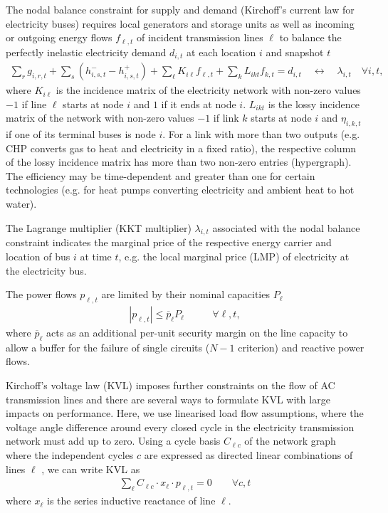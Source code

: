 The nodal balance constraint for supply and demand (Kirchoff's current law for electricity
buses) requires local generators and storage units as well as incoming or
outgoing energy flows $f_{\ell,t}$ of incident transmission lines $\ell$ to
balance the perfectly inelastic electricity demand $d_{i,t}$ at each location
$i$ and snapshot $t$
\begin{align}
    \sum_r g_{i,r,t} + \sum_s \left(h_{i,s,t}^- - h_{i,s,t}^+ \right) + \sum_\ell K_{i\ell} f_{\ell,t} + \sum_k L_{ikt} f_{k,t} = d_{i,t}  \quad \leftrightarrow \quad \lambda_{i,t} \quad \forall i,t,
\end{align}
where $K_{i\ell}$ is the incidence matrix of the electricity network with
non-zero values $-1$ if line $\ell$ starts at node $i$ and $1$ if it ends at
node $i$. $L_{ikt}$ is the lossy incidence matrix of the network with
non-zero values $-1$ if link $k$ starts at node $i$ and $\eta_{i,k,t}$ if one of
its terminal buses is node $i$. For a link with more than two outputs (e.g. CHP
converts gas to heat and electricity in a fixed ratio), the respective column of
the lossy incidence matrix has more than two non-zero entries (hypergraph). The
efficiency may be time-dependent and greater than one for certain technologies
(e.g. for heat pumps converting electricity and ambient heat to hot water).

The Lagrange multiplier (KKT multiplier) $\lambda_{i,t}$ associated with the
nodal balance constraint indicates the marginal price of the respective energy
carrier and location of bus $i$ at time $t$, e.g. the local marginal price (LMP)
of electricity at the electricity bus.

The power flows $p_{\ell,t}$ are limited by their nominal capacities $P_\ell$
\begin{align}
	|p_{\ell,t}| \leq \overline{p}_{\ell} P_{\ell} & \qquad\forall \ell, t,
	\label{eq:cap}
\end{align}
where $\overline{p}_\ell$ acts as an additional per-unit security margin on the line capacity
to allow a buffer for the failure of single circuits ($N-1$ criterion) and reactive power flows.

Kirchoff's voltage law (KVL) imposes further constraints on the flow of AC
transmission lines and there are several ways to formulate KVL with large
impacts on performance. Here, we use linearised load flow assumptions, where the
voltage angle difference around every closed cycle in the electricity
transmission network must add up to zero. Using a cycle basis $C_{\ell c}$ of
the network graph where the independent cycles $c$ are expressed as directed
linear combinations of lines $\ell$ , we can write
KVL as
\begin{align}
    \sum_\ell C_{\ell c} \cdot x_\ell \cdot p_{\ell,t} = 0 \qquad\forall c,t
    \label{eq:kvl}
\end{align}
where $x_\ell$ is the series inductive reactance of line $\ell$.

